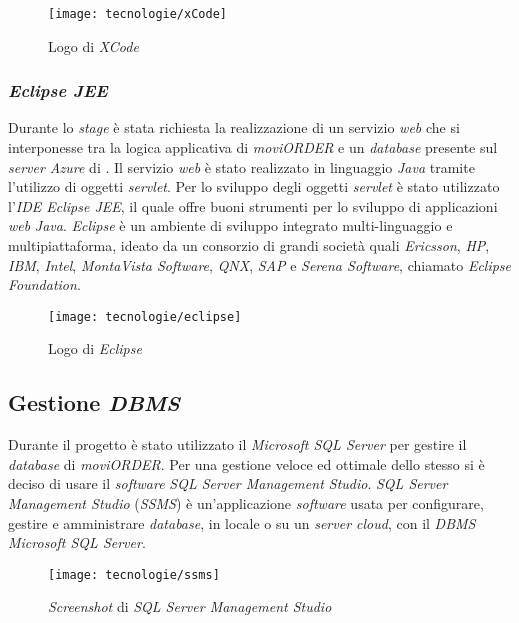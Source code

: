 \begin{figure}[!h] 
    \centering 
    \texttt{[image: tecnologie/xCode]} 
    \caption{Logo di \textit{XCode}}
\end{figure}

\subsubsection{\textit{Eclipse JEE}}

Durante lo \textit{stage} è stata richiesta la realizzazione di un servizio \textit{web} che si interponesse tra la logica applicativa di \textit{moviORDER} e un \textit{database} presente sul \textit{server Azure} di \visione{}. Il servizio \textit{web} è stato realizzato in linguaggio \textit{Java} tramite l'utilizzo di oggetti \textit{servlet}. Per lo sviluppo degli oggetti \textit{servlet} è stato utilizzato l'\textit{IDE Eclipse JEE}, il quale offre buoni strumenti per lo sviluppo di applicazioni \textit{web} \textit{Java}. \textit{Eclipse} è un ambiente di sviluppo integrato multi-linguaggio e multipiattaforma, ideato da un consorzio di grandi società quali \textit{Ericsson}, \textit{HP}, \textit{IBM}, \textit{Intel}, \textit{MontaVista Software}, \textit{QNX}, \textit{SAP} e \textit{Serena Software}, chiamato \textit{Eclipse Foundation}.

\begin{figure}[!h] 
    \centering 
    \texttt{[image: tecnologie/eclipse]} 
    \caption{Logo di \textit{Eclipse}}
\end{figure}

\newpage

\subsection{Gestione \textit{DBMS}}

Durante il progetto è stato utilizzato il  \textit{Microsoft SQL Server} per gestire il \textit{database} di \textit{moviORDER}. Per una gestione veloce ed ottimale dello stesso si è deciso di usare il \textit{software} \textit{SQL Server Management Studio}. \textit{SQL Server Management Studio} (\textit{SSMS}) è un'applicazione \textit{software} usata per configurare, gestire e amministrare \textit{database}, in locale o su un \textit{server cloud}, con il \textit{DBMS Microsoft SQL Server}. 

\begin{figure}[!h] 
    \centering 
    \texttt{[image: tecnologie/ssms]} 
    \caption{\textit{Screenshot} di \textit{SQL Server Management Studio}}
\end{figure}

